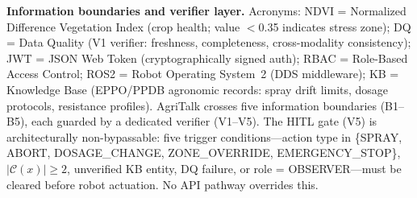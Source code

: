 \documentclass[11pt,a4paper]{article}
\begin{document}
\textbf{Information boundaries and verifier layer.}
Acronyms: NDVI = Normalized Difference Vegetation Index (crop health; value $<$0.35 indicates stress zone); DQ = Data Quality (V1 verifier: freshness, completeness, cross-modality consistency); JWT = JSON Web Token (cryptographically signed auth); RBAC = Role-Based Access Control; ROS2 = Robot Operating System~2 (DDS middleware); KB = Knowledge Base (EPPO/PPDB agronomic records: spray drift limits, dosage protocols, resistance profiles).
AgriTalk crosses five information boundaries (B1--B5), each guarded by a dedicated verifier (V1--V5).
The HITL gate (V5) is architecturally non-bypassable: five trigger conditions---action type in \{SPRAY, ABORT, DOSAGE\_CHANGE, ZONE\_OVERRIDE, EMERGENCY\_STOP\}, $|\mathcal{C}(x)|\geq 2$, unverified KB entity, DQ failure, or role = OBSERVER---must be cleared before robot actuation. No API pathway overrides this.
\end{document}
